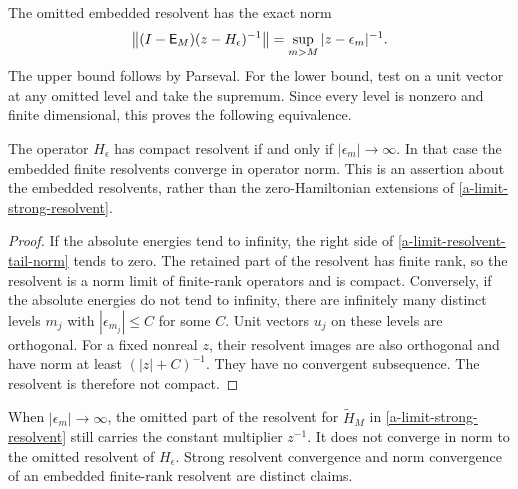 The omitted embedded resolvent has the exact norm
\begin{equation}
 \left\lVert(I-\mathsf E_M)(z-H_\epsilon)^{-1}\right\rVert
 =\sup_{m>M}|z-\epsilon_m|^{-1}.
 \label{a-limit-resolvent-tail-norm}
\end{equation}
The upper bound follows by Parseval. For the lower bound, test on a unit
vector at any omitted level and take the supremum. Since every level is
nonzero and finite dimensional, this proves the following equivalence.

\begin{proposition}
\label{a-limit-compact-resolvent}
The operator $H_\epsilon$ has compact resolvent if and only if
$|\epsilon_m|\to\infty$. In that case the embedded finite resolvents
converge in operator norm. This is an assertion about the embedded
resolvents, rather than the zero-Hamiltonian extensions of
\eqref{a-limit-strong-resolvent}.
\end{proposition}
\begin{proof}
If the absolute energies tend to infinity, the right side of
\eqref{a-limit-resolvent-tail-norm} tends to zero. The retained part of the
resolvent has finite rank, so the resolvent is a norm limit of finite-rank
operators and is compact. Conversely, if the absolute energies do not
tend to infinity, there are infinitely many distinct levels $m_j$ with
$|\epsilon_{m_j}|\leq C$ for some $C$. Unit vectors $u_j$ on these levels
are orthogonal. For a fixed nonreal $z$, their resolvent images are also
orthogonal and have norm at least $(|z|+C)^{-1}$.
They have no convergent subsequence. The resolvent is therefore not
compact.
\end{proof}

When $|\epsilon_m|\to\infty$, the omitted part of the resolvent for
$\widetilde H_M$ in \eqref{a-limit-strong-resolvent} still carries the
constant multiplier $z^{-1}$. It does not converge in norm to the omitted
resolvent of $H_\epsilon$. Strong resolvent convergence and norm
convergence of an embedded finite-rank resolvent are distinct claims.

